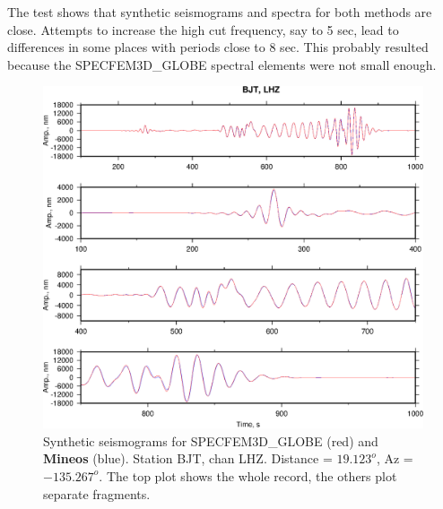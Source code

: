 \noindent The test shows that synthetic seismograms and spectra 
for both methods are close. Attempts to increase the high cut
frequency, say to 5 sec, lead to differences in some places with periods 
close to 8 sec. This probably resulted because the SPECFEM3D\_GLOBE spectral 
elements were not small enough.


\begin{figure}
\begin{center}
\includegraphics[width=7 in]{Figures/FigsBJTLHZ}
\caption{Synthetic seismograms for SPECFEM3D\_GLOBE (red) and {\bf Mineos} (blue). Station BJT, chan LHZ. 
Distance = $19.123^o$, Az = $-135.267^o$.
The top plot shows the whole record, the others plot separate fragments. }
\label{fig:5a}
\end{center}
\end{figure}

